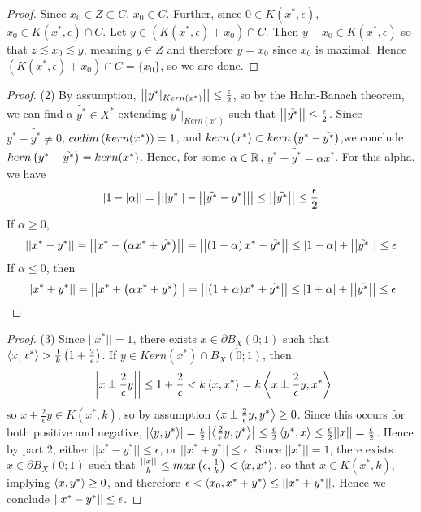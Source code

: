 \begin{lem}
\begin{proof}
        Since $x_0 \in Z \subset C$, $x_0 \in C$. Further, since $0 \in K(x^*,\epsilon)$, $x_0 \in K(x^*,\epsilon) \cap C$. 
        Let $y \in (K(x^*,\epsilon)+x_0) \cap C$. 
        Then $y-x_0 \in K(x^*,\epsilon)$ so that $z \lesssim x_0 \lesssim y$, meaning $y \in Z$ and therefore $y=x_0$ since $x_0$ is maximal. 
        Hence $(K(x^*,\epsilon)+x_0 ) \cap C=\{x_0\}$, so we are done. 
    \end{proof}
    \begin{proof}(2)
        By assumption, $\left|\left| y^*|_{Kern(x^*)} \right|\right| \leq \frac{\epsilon}{2}$, so by the Hahn-Banach theorem, we can find a $\tilde{y^*} \in X^*$ extending $y^*|_{Kern(x^*)}$ such that $\left|\left| \tilde{y^*} \right|\right|\leq \frac{\epsilon}{2}$. 
        Since $y^*-\tilde{y^*} \neq 0$,  $codim\left( kern(x^*)\right)=1$, and  $kern \left( x^*\right) \subset kern\left( y^*-\tilde{y^*}\right)$,we conclude $kern\left( y^*-\tilde{y^*}\right)=kern(x^*)$. Hence, for some $\alpha \in \mathbb{R}$, $y^*-\tilde{y^*}=\alpha x^*$. 
        For this alpha, we have 
        \begin{equation}
            \left| 1-|\alpha| \right| = \left| \left|\left| y^* \right|\right|-\left|\left| \tilde{y^*}-y^* \right|\right| \right| \leq \left|\left| \tilde{y^*} \right|\right| \leq \frac{\epsilon}{2}
        \end{equation}
        If $\alpha \geq 0$, 
        \begin{equation} 
            \left|\left| x^*-y^* \right|\right| =\left|\left| x^*-\left( \alpha x^*+\tilde{y^*}\right) \right|\right|=\left|\left| \left( 1-\alpha\right)x^*-\tilde{y^*} \right|\right| \leq |1-\alpha|+\left|\left| \tilde{y^*} \right|\right| \leq \epsilon
        \end{equation}
        If $\alpha \leq 0$, then 
        \begin{equation} 
            \left|\left| x^*+y^* \right|\right| = \left|\left| x^*+\left( \alpha x^*+\tilde{y^*}\right) \right|\right| = \left|\left| (1+\alpha)x^*+\tilde{y^*} \right|\right| \leq |1+\alpha| + \left|\left| \tilde{y^*} \right|\right| \leq \epsilon
        \end{equation}
    \end{proof}
    \begin{proof}(3)
        Since $||x^*||=1$, there exists $x \in \partial B_X(0;1)$ such that $\left\langle x,x^* \right\rangle > \frac{1}{k} \left( 1+\frac{2}{\epsilon}\right)$. 
        If $y \in Kern(x^*) \cap \overline{B_X(0;1)}$, then \begin{equation}
            \left|\left| x \pm \frac{2}{\epsilon}y \right|\right| \leq 1+\frac{2}{\epsilon} < k \left\langle x,x^* \right\rangle=k \left\langle x \pm \frac{2}{\epsilon}y,x^* \right\rangle
        \end{equation}
        so $x \pm \frac{2}{\epsilon}y \in K(x^*,k)$, so by assumption $\left\langle x \pm \frac{2}{\epsilon}y,y^* \right\rangle \geq 0$. 
        Since this occurs for both positive and negative, $\left| \left\langle y,y^* \right\rangle \right|=\frac{\epsilon}{2}\left| \left\langle \frac{2}{\epsilon}y,y^* \right\rangle \right| \leq \frac{\epsilon}{2}\left\langle y^*,x \right\rangle \leq \frac{\epsilon}{2}||x||=\frac{\epsilon}{2}$. 
        Hence by part 2, either $||x^*-y^*|| \leq \epsilon$, or $||x^*+y^*|| \leq \epsilon$. 
        Since $||x^*||=1$, there exists $x \in \partial B_X(0;1)$ such that $\frac{||x||}{k} \leq max \left( \epsilon, \frac{1}{k}\right) < \left\langle x,x^* \right\rangle$, so that $x \in K(x^*,k)$, implying $\left\langle x,y^* \right\rangle \geq 0$, and therefore $\epsilon < \left\langle x_0,x^*+y^* \right\rangle \leq \left|\left| x^*+y^* \right|\right|$. Hence we conclude $\left|\left| x^*-y^* \right|\right| \leq \epsilon$. 
        
    \end{proof} 
\end{lem}
